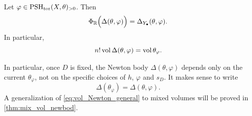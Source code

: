 \begin{theorem}\label{thm:toricpob}
    Let $\varphi\in \mathrm{PSH}_{\mathrm{tor}}(X,\theta)_{>0}$. Then
    \begin{equation}\label{eq:toricOkounkovcomp}
    \Phi_{\mathbb{R}}\Bigl(  \Delta(\theta,\varphi)\Bigr)=\Delta_{Y_{\bullet}}(\theta,\varphi).
    \end{equation}
    In particular,
    \begin{equation}\label{eq:vol_Newton_general}
        n!\operatorname{vol} \Delta(\theta,\varphi)=\operatorname{vol} \theta_{\varphi}.
    \end{equation}
\end{theorem}
In particular, once $D$ is fixed, the Newton body $\Delta(\theta,\varphi)$ depends only on the current $\theta_{\varphi}$, not on the specific choices of $h$, $\varphi$ and $s_D$. It makes sense to write
\[
\Delta\left(\theta_{\varphi}\right)=\Delta(\theta,\varphi).
\]
A generalization of \eqref{eq:vol_Newton_general} to mixed volumes will be proved in \cref{thm:mix_vol_newbod}.

